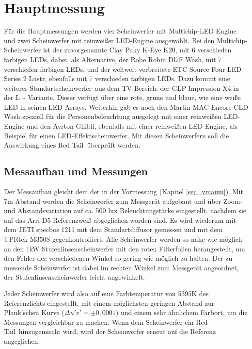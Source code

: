 \chapter{Hauptmessung}
Für die Hauptmessungen werden vier Scheinwerfer mit Multichip-LED Engine und zwei Scheinwerfer mit reinweißer LED-Engine ausgewählt. Bei den Multichip-Scheinwerfer ist der zuvorgenannte Clay Paky K-Eye K20, mit 6 verschieden farbigen LEDs, dabei, als Alternative, der Robe Robin Dl7F Wash, mit 7 verschieden farbigen LEDs, und der weltweit verbreitete ETC Source Four LED Series 2 Lustr, ebenfalls mit 7 verschieden farbigen LEDs. Dazu kommt eine weiterer \glqq Standartscheinwerfer\grqq\ aus dem TV-Bereich: der GLP Impression X4 in der \glqq L\grqq\ - Variante. Dieser verfügt über eine rote, grüne und blaue, wie eine weiße LED in seinen LED-Arrays. Weiterhin gab es noch den Martin MAC Encore CLD Wash speziell für die Personenbeleuchtung ausgelegt mit einer reinweißen LED-Engine und den Ayrton Ghibli, ebenfalls mit einer reinweißen LED-Engine, als Beispiel für einen LED-Effektscheinwerfer. 
Mit diesen Scheinwerfern soll die Auswirkung eines \glqq Red Tail\grqq\ überprüft werden.



\section{Messaufbau und Messungen}
\label{sec_hmaufbau}
Der Messaufbau gleicht dem der in der Vormessung (Kapitel \ref{sec_vmaum}). Mit 7m Abstand werden die Scheinwerfer zum Messgerät aufgebaut und über Zoom- und Abstandsvariation auf ca. 500 lux Beleuchtungstärke eingestellt, nachdem sie auf das Arri D5-Referenzweiß abgeglichen worden sind. Es wird wiederum mit dem JETI specbos 1211 mit dem Standartdiffusor gemessen und mit dem UPRtek M350S gegenkontrolliert. Alle Scheinwerfer werden so nahe wie möglich an den 1kW Stufenlinsenscheinwerfer mit den roten Filterfolien herangestellt, um den Fehler der verschiedenen Winkel so gering wie möglich zu halten. Der zu messende Scheinwerfer ist dabei im rechten Winkel zum Messgerät angeordnet, der Stufenlinsenscheinwerfer leicht angewinkelt. 


Jeder Scheinwerfer wird also auf eine Farbtemperatur von 5395K des Referenzlichts eingestellt, mit einem möglichsten geringen Abstand zur Plank'schen Kurve ($ \Delta u'v'=\pm0,0001$) und einem sehr ähnlichem Farbort, um die Messungen vergleichbar zu machen. Wenn dem Scheinwerfer ein \glqq Red Tail\grqq\ hinzugemischt wird, wird der Scheinwerfer erneut auf die Referenz angeglichen. 

